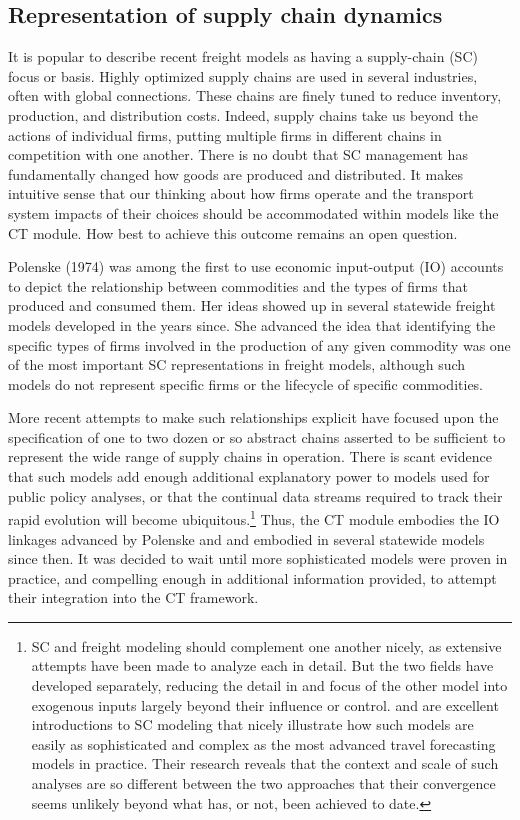 \subsection{Representation of supply chain dynamics}

It is popular to describe recent freight models as having a supply-chain (SC) focus or basis. Highly optimized supply chains are used in several industries, often with global connections. These chains are finely tuned to reduce inventory, production, and distribution costs. Indeed, supply chains take us beyond the actions of individual firms, putting multiple firms in different chains in competition with one another. There is no doubt that SC management has fundamentally changed how goods are produced and distributed. It makes intuitive sense that our thinking about how firms operate and the transport system impacts of their choices should be accommodated within models like the CT module. How best to achieve this outcome remains an open question.

Polenske (1974) was among the first to use economic input-output (IO) accounts to depict the relationship between commodities and the types of firms that produced and consumed them. Her ideas showed up in several statewide freight models developed in the years since. She advanced the idea that identifying the specific types of firms involved in the production of any given commodity was one of the most important SC representations in freight models, although such models do not represent specific firms or the lifecycle of specific commodities.

More recent attempts to make such relationships explicit have focused upon the specification of one to two dozen or so abstract chains asserted to be sufficient to represent the wide range of supply chains in operation. There is scant evidence that such models add enough additional explanatory power to models used for public policy analyses, or that the continual data streams required to track their rapid evolution will become ubiquitous.\footnote{SC and freight modeling should complement one another nicely, as extensive attempts have been made to analyze each in detail. But the two fields have developed separately, reducing the detail in and focus of the other model into exogenous inputs largely beyond their influence or control. \cite{watson13} and \cite{shapiro06} are excellent introductions to SC modeling that nicely illustrate how such models are easily as sophisticated and complex as the most advanced travel forecasting models in practice. Their research reveals that the context and scale of such analyses are so different between the two approaches that their convergence seems unlikely beyond what has, or not, been achieved to date.} Thus, the CT module embodies the IO linkages advanced by Polenske and \cite{harker87} and embodied in several statewide models since then. It was decided to wait until more sophisticated models were proven in practice, and compelling enough in additional information provided, to attempt their integration into the CT framework.

